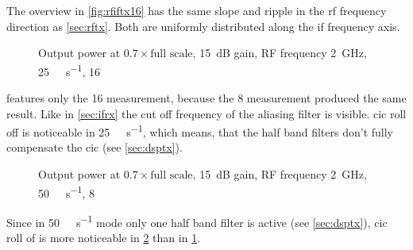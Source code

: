 \documentclass[12pt,a4paper,parskip=full,abstracton]{scrartcl}
\begin{document}
The overview in \cref{fig:rfiftx16} has the same slope and ripple
in the \gls{rf} frequency direction as \cref{sec:rftx}. Both are uniformly
distributed along the \gls{if} frequency axis.

\begin{figure}[htb]
    \centering
{}
    \caption{Output power at $0.7 \times \text{full scale}$, \SI{15}{\deci\bel} gain, RF frequency \SI{2}{\giga\hertz}, \SI{25}{\mega\samples\per\second}, \SI{16}{\bit}}
    \label{fig:iftx}
\end{figure}

 features only the \SI{16}{\bit} measurement, because the \SI{8}{\bit}
measurement produced the same result. Like in \cref{sec:ifrx} the cut off frequency
of the aliasing filter is visible. \gls{cic} roll off is noticeable in
\SI{25}{\mega\samples\per\second}, which means, that the half band filters don't fully
compensate the \gls{cic} (see \cref{sec:dsptx}).

\begin{figure}[htb]
    \centering
{}
    \caption{Output power at $0.7 \times \text{full scale}$, \SI{15}{\deci\bel} gain, RF frequency \SI{2}{\giga\hertz}, \SI{50}{\mega\samples\per\second}, \SI{8}{\bit}}
    \label{fig:iftx50}
\end{figure}

Since in \SI{50}{\mega\samples\per\second} mode only one half band filter
is active (see \cref{sec:dsptx}), \gls{cic} roll of is more noticeable in
\cref{fig:iftx50} than in \cref{fig:iftx}.
\end{document}
